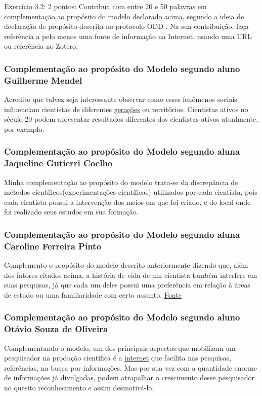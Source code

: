 Exercício 3.2: 2 pontos: Contribua com entre 20 e 50 palavras em complementação ao propósito do modelo declarado acima, segundo a ideia de declaração de propósito descrita no protocolo ODD \citep{grimm_standard_2006}.
Na sua contribuição, faça referência a pelo menos uma fonte de informação na Internet, usando uma URL ou referência no Zotero.

\subsubsection{Complementação ao propósito do Modelo segundo aluno Guilherme Mendel}
Acredito que talvez seja interessante observar como esses fenômenos sociais influenciam cientistas de diferentes \href{https://pt.wikipedia.org/wiki/Gera\%C3\%A7\%C3\%A3o}{gerações} ou territórios. Cientistas ativos no século 20 podem apresentar resultados diferentes dos cientistas ativos atualmente, por exemplo.

    
\subsubsection{Complementação ao propósito do Modelo segundo aluna Jaqueline Gutierri Coelho}
Minha complementação ao propósito do modelo trata-se da discrepância de métodos científicos(experimentações científicas) utilizados por cada cientista, pois cada cientista possui a intervenção dos meios em que foi criado, e do local onde foi realizado seus estudos em sua formação. \citep{vernotte_risk-driven_2015}

\subsubsection{Complementação ao propósito do Modelo segundo aluna Caroline Ferreira Pinto}
Complemento o propósito do modelo descrito anteriormente dizendo que, além dos fatores citados acima, a história de vida de um cientista também interfere em suas pesquisas, já que cada um deles possui uma preferência em relação à áreas de estudo ou uma familiaridade com certo assunto. \href{https://comportese.com/2014/05/01/o-comportamento-do-cientista}{Fonte}

\subsubsection{Complementação ao propósito do Modelo segundo aluno Otávio Souza de Oliveira}

Complementando o modelo, um dos principais aspectos que mobilizam um pesquisador na produção científica é a \href{https://www.scielo.br/j/pci/a/ww5zR3KhYCk65bPkWJyTQtf/?lang=pt}{internet} que facilita nas pesquisas, referências, na busca por informações. Mas por sua vez com a quantidade enorme de informações já divulgadas, podem atrapalhar o crescimento desse pesquisador no quesito reconhecimento e assim desmotivá-lo.


